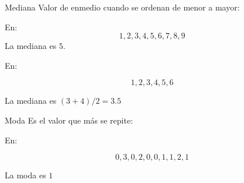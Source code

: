 \documentclass[
  11pt,
  ignorenonframetext,
]{beamer}
\begin{document}
\begin{frame}{Mediana}
\protect\hypertarget{mediana}{}
Valor de enmedio cuando se ordenan de menor a mayor:

En: \[ 1, 2, 3, 4, 5, 6, 7, 8, 9\] La mediana es \(5\).

En:

\[1, 2, 3, 4, 5, 6\]

La mediana es \((3+4)/2 = 3.5\)
\end{frame}

\begin{frame}{Moda}
\protect\hypertarget{moda}{}
Es el valor que más se repite:

En:

\[0, 3, 0, 2, 0, 0, 1, 1, 2, 1\]

La moda es \(1\)
\end{frame}
\end{document}
